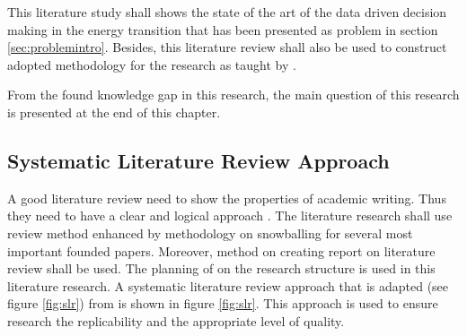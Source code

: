 This literature study shall shows the state of the art of the data driven decision making in the energy transition that has been presented as problem in section \ref{sec:problemintro}. Besides, this literature review shall also be used to construct adopted methodology for the research as taught by  \citep{Ridley2012TheStudents}. 

From the found knowledge gap in this  research, the main question of this research is presented at the end of this chapter.

\subsection{Systematic Literature Review Approach}
A good literature review need to show the properties of academic writing. Thus they need to have a clear and logical approach \citep{Hart1998DoingPaperback}. The literature research shall use \citep{Kitchenham2009SystematicReview, Kitchenham2007GuidelinesEngineering} review method enhanced by  \citep{Jalali2012SystematicSnowballing, Wohlin2014GuidelinesEngineering} methodology on snowballing for several most important founded papers. Moreover, \citep{Levy2006AResearch} method on creating report on literature review shall be used. The planning of \citep{Webster2002Analyzing.} on the research structure is used in this literature research.   
A systematic literature review approach that is adapted  (see figure \ref{fig:slr}) from \citep{Kitchenham2007GuidelinesEngineering} is shown in figure \ref{fig:slr}. This approach is used to ensure research the replicability and the appropriate level of quality. 

